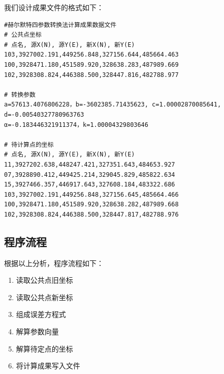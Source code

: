 我们设计成果文件的格式如下：

\begin{verbatim}
#赫尔默特四参数转换法计算成果数据文件
# 公共点坐标
# 点名, 源X(N), 源Y(E), 新X(N), 新Y(E)
103,3927002.191,449256.848,327156.644,485664.463
100,3928471.180,451589.920,328638.283,487989.669
102,3928308.824,446388.500,328447.816,482788.977

# 转换参数
a=57613.4076806228，b=-3602385.71435623, c=1.00002870085641, d=-0.00540327780963763
α=-0.183446321911374，k=1.00004329803646

# 待计算点的坐标
# 点名, 源X(N), 源Y(E), 新X(N), 新Y(E)
11,3927202.638,448247.421,327351.643,484653.927
07,3928890.412,449425.214,329045.829,485822.634
15,3927466.357,446917.643,327608.184,483322.686
103,3927002.191,449256.848,327156.645,485664.466
100,3928471.180,451589.920,328638.282,487989.668
102,3928308.824,446388.500,328447.817,482788.976
\end{verbatim}

\subsection{程序流程}
根据以上分析，程序流程如下：
\begin{enumerate}
  \item 读取公共点旧坐标
  \item 读取公共点新坐标
  \item 组成误差方程式
  \item 解算参数向量
  \item 解算待定点的坐标
  \item 将计算成果写入文件
\end{enumerate}


